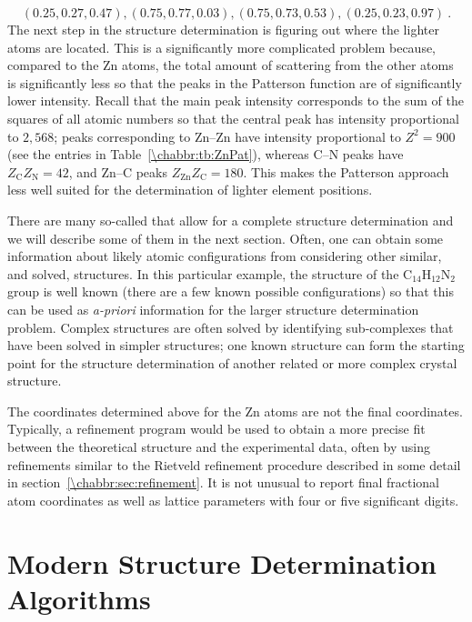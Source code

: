 \[
	(0.25,0.27,0.47), (0.75,0.77,0.03), (0.75,0.73,0.53), (0.25,0.23,0.97)\ .
\]
The next step in the structure determination is figuring out where the lighter atoms are located.  This is a significantly more complicated problem because, compared to the Zn atoms, the total amount of scattering from the other atoms is significantly less so that the peaks in the Patterson function are of significantly lower intensity.  Recall that the main peak intensity corresponds to the sum of the squares of all atomic numbers so that the central peak has intensity proportional to $2,568$; peaks corresponding to Zn--Zn have intensity proportional to $Z^2 = 900$ (see the entries in Table~\ref{\chabbr:tb:ZnPat}), whereas C--N peaks have $Z_{\text{C}}Z_{\text{N}}=42$, and Zn--C peaks $Z_{\text{Zn}}Z_{\text{C}}=180$.  This makes the Patterson approach less well suited for the determination of lighter element positions.

There are many so-called  that allow for a complete structure determination and we will describe some of them in the next section.  Often, one can obtain some information about likely atomic configurations from considering other similar, and solved, structures. In this particular example, the structure of the $\text{C}_{14}\text{H}_{12}\text{N}_2$ group is well known (there are a few known possible configurations) so that this can be used as \textit{a-priori} information for the larger structure determination problem.  Complex structures are often solved by identifying sub-complexes that have been solved in simpler structures; one known structure can form the starting point for the structure determination of another related or more complex crystal structure.  

The coordinates determined above for the Zn atoms are not the final coordinates. Typically, a refinement program would be used to obtain a more precise fit between the theoretical structure and the experimental data, often by using refinements similar to the Rietveld refinement procedure described in some detail in section~\ref{\chabbr:sec:refinement}.  It is not unusual to report final fractional atom coordinates as well as lattice parameters with four or five significant digits.



\section{Modern Structure Determination Algorithms}\label{\chabbr:secc:modernalgorithms}


